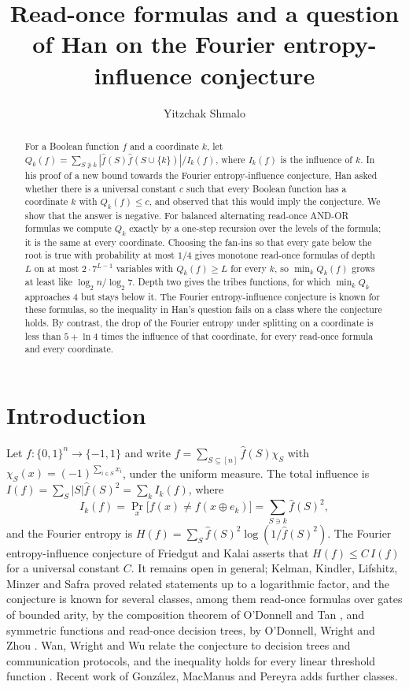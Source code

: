 \documentclass[11pt]{amsart}
\title[A question of Han on Fourier coefficients]{Read-once formulas and a question of Han on the Fourier
entropy-influence conjecture}
\author{Yitzchak Shmalo}
\theoremstyle{definition}\newtheorem{definition}[theorem]{Definition}
\theoremstyle{remark}\newtheorem{remark}[theorem]{Remark}
\newcommand{\hf}{\widehat{f}}
\begin{document}
\begin{abstract}
For a Boolean function $f$ and a coordinate $k$, let $Q_k(f)=\sum_{S\not\ni k}|\hf(S)\hf(S\cup\{k\})|/I_k(f)$,
where $I_k(f)$ is the influence of $k$. In his proof of a new bound towards the Fourier entropy-influence
conjecture, Han asked whether there is a universal constant $c$ such that every Boolean function has a coordinate
$k$ with $Q_k(f)\le c$, and observed that this would imply the conjecture. We show that the answer is negative. For
balanced alternating read-once AND-OR formulas we compute $Q_k$ exactly by a one-step recursion over the levels of
the formula; it is the same at every coordinate. Choosing the fan-ins so that every gate below the root is true with
probability at most $1/4$ gives monotone read-once formulas of depth $L$ on at most $2\cdot 7^{L-1}$ variables with
$Q_k(f)\ge L$ for every $k$, so $\min_k Q_k(f)$ grows at least like $\log_2 n/\log_2 7$. Depth two gives the tribes
functions, for which $\min_k Q_k$ approaches $4$ but stays below it. The Fourier entropy-influence conjecture is
known for these formulas, so the inequality in Han's question fails on a class where the conjecture holds. By
contrast, the drop of the Fourier entropy under splitting on a coordinate is less than $5+\ln 4$ times the
influence of that coordinate, for every read-once formula and every coordinate.
\end{abstract}
\maketitle

\section{Introduction}

Let $f\colon\{0,1\}^n\to\{-1,1\}$ and write $f=\sum_{S\subseteq[n]}\hf(S)\chi_S$ with $\chi_S(x)=(-1)^{\sum_{i\in S}x_i}$,
under the uniform measure. The total influence is $I(f)=\sum_S|S|\hf(S)^2=\sum_k I_k(f)$, where
\[
I_k(f)=\Pr_x\bigl[f(x)\ne f(x\oplus e_k)\bigr]=\sum_{S\ni k}\hf(S)^2 ,
\]
and the Fourier entropy is $H(f)=\sum_S\hf(S)^2\log(1/\hf(S)^2)$. The Fourier entropy-influence conjecture of
Friedgut and Kalai \cite{fk} asserts that $H(f)\le C\,I(f)$ for a universal constant $C$. It remains open in general;
Kelman, Kindler, Lifshitz, Minzer and Safra \cite{kklms} proved related statements up to a logarithmic factor, and
the conjecture is known for several classes, among them read-once formulas over gates of bounded arity, by the
composition theorem of O'Donnell and Tan \cite{ot}, and symmetric functions and read-once decision trees, by
O'Donnell, Wright and Zhou \cite{owz}. Wan, Wright and Wu \cite{www} relate the conjecture to decision trees and
communication protocols, and the inequality holds for every linear threshold function \cite{shm}. Recent work of
Gonz\'alez, MacManus and Pereyra \cite{gmp} adds further classes.
\end{document}
